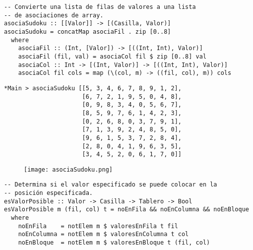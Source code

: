 \documentclass{beamer}
\begin{document}

\begin{frame}[fragile]
\begin{verbatim}
-- Convierte una lista de filas de valores a una lista 
-- de asociaciones de array.
asociaSudoku :: [[Valor]] -> [(Casilla, Valor)]
asociaSudoku = concatMap asociaFil . zip [0..8]
  where
    asociaFil :: (Int, [Valor]) -> [((Int, Int), Valor)]
    asociaFil (fil, val) = asociaCol fil $ zip [0..8] val
    asociaCol :: Int -> [(Int, Valor)] -> [((Int, Int), Valor)]
    asociaCol fil cols = map (\(col, m) -> ((fil, col), m)) cols
\end{verbatim}
\end{frame}


\begin{frame}[fragile]
\begin{verbatim}
*Main > asociaSudoku [[5, 3, 4, 6, 7, 8, 9, 1, 2], 
                      [6, 7, 2, 1, 9, 5, 0, 4, 8], 
                      [0, 9, 8, 3, 4, 0, 5, 6, 7], 
                      [8, 5, 9, 7, 6, 1, 4, 2, 3], 
                      [0, 2, 6, 8, 0, 3, 7, 9, 1], 
                      [7, 1, 3, 9, 2, 4, 8, 5, 0], 
                      [9, 6, 1, 5, 3, 7, 2, 8, 4], 
                      [2, 8, 0, 4, 1, 9, 6, 3, 5], 
                      [3, 4, 5, 2, 0, 6, 1, 7, 0]]
\end{verbatim}
\begin{figure}[H]
  \centering
  \texttt{[image: asociaSudoku.png]}
\end{figure}
\end{frame}


\begin{frame}[fragile]
\begin{verbatim}
-- Determina si el valor especificado se puede colocar en la 
-- posición especificada.
esValorPosible :: Valor -> Casilla -> Tablero -> Bool
esValorPosible m (fil, col) t = noEnFila && noEnColumna && noEnBloque
  where
    noEnFila    = notElem m $ valoresEnFila t fil
    noEnColumna = notElem m $ valoresEnColumna t col
    noEnBloque  = notElem m $ valoresEnBloque t (fil, col)
\end{verbatim}
\end{frame}

\end{document}

